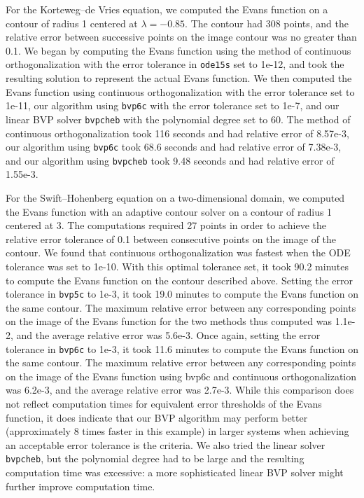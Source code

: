 \documentclass[10pt]{article}
\numberwithin{equation}{section}
\begin{document}
For the Korteweg--de Vries equation, we computed the Evans function on a contour of radius 1 centered at $\lambda=-0.85$. The contour had 308 points, and the relative error between successive points on the image contour was no greater than 0.1. We began by computing the Evans function using the method of continuous orthogonalization with the error tolerance in \texttt{ode15s} set to 1e-12, and took the resulting solution to represent the actual Evans function. We then computed the Evans function using continuous orthogonalization with the error tolerance set to 1e-11, our algorithm using \texttt{bvp6c} with the error tolerance set to 1e-7, and our linear BVP solver \texttt{bvpcheb} with the polynomial degree set to 60. The method of continuous orthogonalization took 116 seconds and had relative error of 8.57e-3, our algorithm using \texttt{bvp6c} took 68.6 seconds and had relative error of 7.38e-3, and our algorithm using \texttt{bvpcheb} took 9.48 seconds and had relative error of 1.55e-3.

For the Swift--Hohenberg equation on a two-dimensional domain, we computed the Evans function with an adaptive contour solver on a contour of radius 1 centered at 3. The computations required 27 points in order to achieve the relative error tolerance of 0.1 between consecutive points on the image of the contour. We found that continuous orthogonalization was fastest when the ODE tolerance was set to 1e-10. With this optimal tolerance set, it took 90.2 minutes to compute the Evans function on the contour described above. Setting the error tolerance in \texttt{bvp5c} to 1e-3, it took 19.0 minutes to compute the Evans function on the same contour. The maximum relative error between any corresponding points on the image of the Evans function for the two methods thus computed was 1.1e-2, and the average relative error was 5.6e-3. Once again, setting the error tolerance in \texttt{bvp6c} to 1e-3, it took 11.6 minutes to compute the Evans function on the same contour. The maximum relative error between any corresponding points on the image of the Evans function using bvp6c and continuous orthogonalization was 6.2e-3, and the average relative error was 2.7e-3.  While this comparison does not reflect computation times for equivalent error thresholds of the Evans function, it does indicate that our BVP algorithm may perform better (approximately 8 times faster in this example) in larger systems when achieving an acceptable error tolerance is the criteria. We also tried the linear solver \texttt{bvpcheb}, but the polynomial degree had to be large and the resulting computation time was excessive: a more sophisticated linear BVP solver might further improve computation time.
\end{document}
